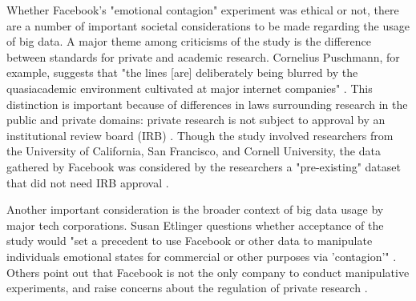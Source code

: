 Whether Facebook’s "emotional contagion"
experiment was ethical or
not, there are a number of important
societal considerations to be made regarding
the usage of big data. A major
theme among criticisms of the study
is the difference between standards
for private and academic research.
Cornelius Puschmann, for example,
suggests that "the lines [are] deliberately
being blurred by the quasiacademic
environment cultivated at
major internet companies" \cite{terrain}. This
distinction is important because of
differences in laws surrounding research
in the public and private domains:
private research is not subject
to approval by an institutional review
board (IRB) \cite{irb}. Though the study
involved researchers from the University
of California, San Francisco, and
Cornell University, the data gathered by Facebook
was considered by the researchers a "pre-existing"
dataset that did not need IRB approval \cite{atlantic}. \par
Another important consideration
is the broader context of big data usage
by major tech corporations. Susan
Etlinger questions whether acceptance
of the study would "set a precedent
to use Facebook or other data
to manipulate individuals emotional
states for commercial or other purposes
via 'contagion'" \cite{etlinger}. Others
point out that Facebook is not the
only company to conduct manipulative
experiments, and raise concerns
about the regulation of private research
\cite{guardian}.
